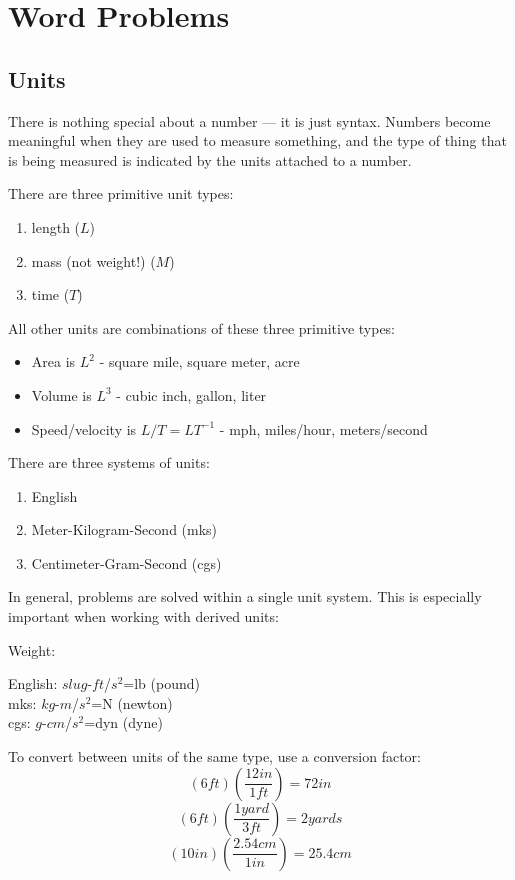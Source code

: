 \documentclass[letterpaper,12pt,fleqn]{article}
\begin{document}
\section*{Word Problems}

\subsection*{Units}

There is nothing special about a number --- it is just syntax. Numbers become
meaningful when they are used to measure something, and the type of thing that
is being measured is indicated by the units attached to a number.

There are three primitive unit types:
\begin{enumerate}
\item length ($L$)
\item mass (not weight!) ($M$)
\item time ($T$)
\end{enumerate}

All other units are combinations of these three primitive types:
\begin{itemize}
\item Area is $L^2$ - square mile, square meter, acre
\item Volume is $L^3$ - cubic inch, gallon, liter
\item Speed/velocity is $L/T=LT^{-1}$ - mph, miles/hour, meters/second
\end{itemize}

There are three systems of units:
\begin{enumerate}
\item English
\item Meter-Kilogram-Second (mks)
\item Centimeter-Gram-Second (cgs)
\end{enumerate}

In general, problems are solved within a single unit system. This is especially
important when working with derived units:

Weight:

English: $slug$-$ft$/$s^2$=lb (pound) \\
mks: $kg$-$m$/$s^2$=N (newton) \\
cgs: $g$-$cm$/$s^2$=dyn (dyne)

To convert between units of the same type, use a conversion factor:
\[(6 ft)\left(\frac{12 in}{1 ft}\right)=72 in\]
\[(6 ft)\left(\frac{1 yard}{3 ft}\right)=2 yards\]
\[(10 in)\left(\frac{2.54 cm}{1 in}\right)=25.4 cm\]
\end{document}
